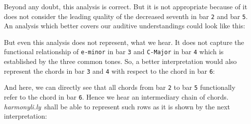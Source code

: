 \documentclass[
  DIV=calc,
  BCOR=5mm,
  12pt,
  headings=small,
  oneside,
  abstract=true,
  toc=bib,
  xcolor=dvipsnames,
  openany,
  english]{scrartcl}
\newcommand{\hlyn}[0]{\textit{harmonyli.ly}}
\begin{document}
Beyond any doubt, this analysis is correct. But it is not appropriate because of it
does not consider the leading quality of the decreased seventh in bar \texttt{2}
and bar \texttt{5}. An analysis which better covers our auditive understandings
could look like this:

\begin{center}
\end{center}

But even this analysis does not represent, what we hear. It does not capture the
functional relationship of \texttt{e-minor} in bar \texttt{3} and
\texttt{C-Major} in bar \texttt{4} which is established by the three common
tones. So, a better interpretation would also represent the chords in bar
\texttt{3} and \texttt{4} with respect to the chord in  bar \texttt{6}:

\begin{center}
\end{center}

And here, we can directly see that all chords from bar \texttt{2} to bar
\texttt{5} functionally refer to the chord in bar \texttt{6}. Hence we hear an
intermediary chain of chords. \hlyn\ shall be able to represent such rows as it
is shown by the next interpretation:
\end{document}
